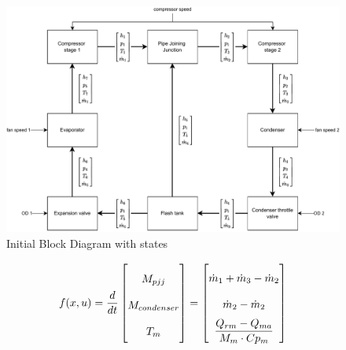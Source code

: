 \begin{figure}[h!]
	\centering
	\includegraphics[width=1\textwidth]{Graphics/Block_Diagram.pdf}
	\caption{Initial Block Diagram with states}
	\label{fig:Block_diagram}
\end{figure}



\begin{equation} \label{eq:consump_x} \renewcommand{\arraystretch}{2}
	f(x,u) =  \dfrac{d}{dt} \begin{bmatrix}
		M_{pjj}		\\
		M_{condenser} 	\\
		T_m 			\\
	\end{bmatrix}
	=
	\begin{bmatrix}
		\dot{m}_1 + \dot{m}_3 - \dot{m}_2 \\										%
		\dot{m}_{2} - \dot{m}_{2}	\\												%
		\dfrac{Q_{rm} - Q_{ma}}{M_m \cdot Cp_m} \\									%
	\end{bmatrix}
\end{equation}




